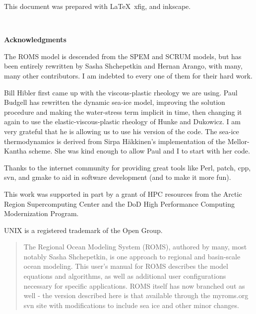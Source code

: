 \setcounter{page}{0}
This document was prepared with \LaTeX\, xfig, and inkscape.

\mbox{  }
\begin{center}
\bf \LARGE Acknowledgments
\end{center}

The ROMS model is descended from the SPEM and SCRUM models, but has
been entirely rewritten by Sasha Shchepetkin and Hernan Arango, with
many, many other contributors. I am indebted to every one of them
for their hard work.

Bill Hibler first came up with the viscous-plastic rheology we are
using. Paul Budgell has rewritten the dynamic sea-ice model, improving
the solution procedure and making the water-stress term implicit in time,
then changing it again to use the elastic-viscous-plastic rheology of
Hunke and Dukowicz. I am very grateful that he is allowing us to use
his version of the code. The sea-ice thermodynamics is derived from
Sirpa H\"akkinen's implementation of the Mellor-Kantha scheme. She was
kind enough to allow Paul and I to start with her code.

Thanks to the internet community for providing great tools like Perl,
patch, cpp, svn, and gmake to aid in software development (and to make
it more fun).

This work was supported in part by a grant of HPC resources from the
Arctic Region Supercomputing Center and the DoD High Performance
Computing Modernization Program.

\vspace{\fill}
UNIX is a registered trademark of the Open Group.


\vfil\break
\begin{abstract}
The Regional Ocean Modeling System (ROMS), authored by many, most
notably Sasha Shchepetkin, is one approach to regional and basin-scale ocean
modeling. This user's manual for ROMS describes the model equations
and algorithms, as well as additional user configurations necessary
for specific applications. ROMS itself has now branched out as
well - the version described here is that available through the
myroms.org svn site with modifications to include sea ice and other
minor changes.

\end{abstract}
